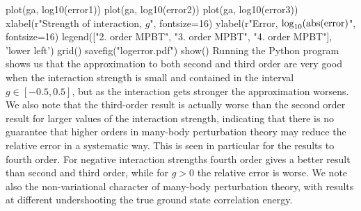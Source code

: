 \documentclass[%
twoside,                 %
final,                   %
10pt]{article}
\newenvironment{doconceexercise}{}{}
\begin{document}
\begin{doconceexercise}
plot(ga, log10(error1))
plot(ga, log10(error2))
plot(ga, log10(error3))
xlabel(r"Strength of interaction, $g$", fontsize=16)
ylabel(r"Error, $\log_{\rm 10}({\rm abs}({\rm error})$", fontsize=16)
legend(["2. order MPBT", "3. order MPBT", "4. order MPBT"], 'lower left')
grid()
savefig("logerror.pdf")
show()
\epypro
Running the Python program shows us that
the approximation to both second and third order are very
good when the interaction strength is small and contained in the interval  
$g\in[-0.5,0.5]$, but as the
interaction gets stronger the approximation worsens. We also
note that the third-order result is actually worse than the second order result 
for larger values of the interaction strength, indicating that there is no guarantee that higher orders
in many-body perturbation theory may reduce the relative error in a systematic way.
This is seen in particular for the results to fourth order. For negative interaction strengths 
fourth order gives a better result than second and third order, while for $g>0$ the relative error is 
worse.
We note also the non-variational character of many-body perturbation theory, with results at different undershooting the true ground state correlation energy.


\end{doconceexercise}
\end{document}
